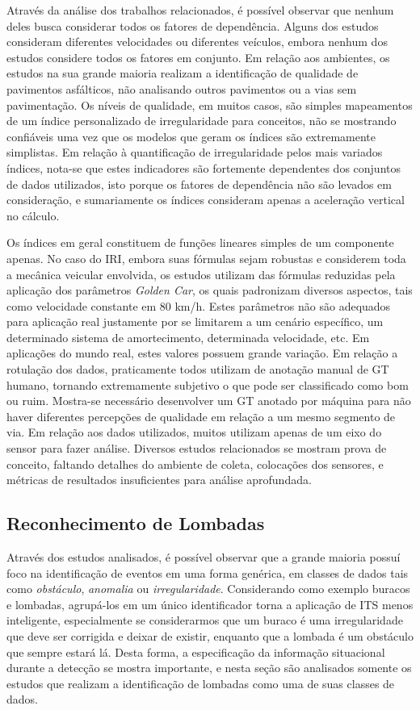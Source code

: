 Através da análise dos trabalhos relacionados, é possível observar que nenhum deles busca considerar todos os fatores de dependência. Alguns dos estudos consideram diferentes velocidades ou diferentes veículos, embora nenhum dos estudos considere todos os fatores em conjunto. Em relação aos ambientes, os estudos na sua grande maioria realizam a identificação de qualidade de pavimentos asfálticos, não analisando outros pavimentos ou a vias sem pavimentação. Os níveis de qualidade, em muitos casos, são simples mapeamentos de um índice personalizado de irregularidade para conceitos, não se mostrando confiáveis uma vez que os modelos que geram os índices são extremamente simplistas. Em relação à quantificação de irregularidade pelos mais variados índices, nota-se que estes indicadores são fortemente dependentes dos conjuntos de dados utilizados, isto porque os fatores de dependência não são levados em consideração, e sumariamente os índices consideram apenas a aceleração vertical no cálculo. 

Os índices em geral constituem de funções lineares simples de um componente apenas. No caso do IRI, embora suas fórmulas sejam robustas e considerem toda a mecânica veicular envolvida, os estudos utilizam das fórmulas reduzidas pela aplicação dos parâmetros \textit{Golden Car}, os quais padronizam diversos aspectos, tais como velocidade constante em 80 km/h. Estes parâmetros não são adequados para aplicação real justamente por se limitarem a um cenário específico, um determinado sistema de amortecimento, determinada velocidade, etc. Em aplicações do mundo real, estes valores possuem grande variação. Em relação a rotulação dos dados, praticamente todos utilizam de anotação manual de GT humano, tornando extremamente subjetivo o que pode ser classificado como bom ou ruim. Mostra-se necessário desenvolver um GT anotado por máquina para não haver diferentes percepções de qualidade em relação a um mesmo segmento de via. Em relação aos dados utilizados, muitos utilizam apenas de um eixo do sensor para fazer análise.  Diversos estudos relacionados se mostram prova de conceito, faltando detalhes do ambiente de coleta, colocações dos sensores, e métricas de resultados insuficientes para análise aprofundada.

\subsection{Reconhecimento de Lombadas}

Através dos estudos analisados, é possível observar que a grande maioria possuí foco na identificação de eventos em uma forma genérica, em classes de dados tais como \emph{obstáculo}, \emph{anomalia} ou \emph{irregularidade}. Considerando como exemplo buracos e lombadas, agrupá-los em um único identificador torna a aplicação de ITS menos inteligente, especialmente se considerarmos que um buraco é uma irregularidade que deve ser corrigida e deixar de existir, enquanto que a lombada é um obstáculo que sempre estará lá. Desta forma, a especificação da informação situacional durante a detecção se mostra importante, e nesta seção são analisados somente os estudos que realizam a identificação de lombadas como uma de suas classes de dados.

